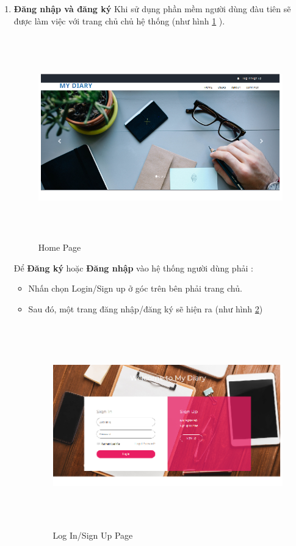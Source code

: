 \documentclass[a4paper]{article}
\begin{document}
	\begin{enumerate}
		\item \textbf{Đăng nhập và đăng ký}
		Khi sử dụng phần mềm người dùng đàu tiên sẽ được làm việc với trang chủ chủ hệ thống (như hình \ref{mainbook16} ).

		\begin{figure}[!h]
	 			\centering
      			\includegraphics[height=250pt,width=340pt]{Images/h8.png}
	 		 	\caption{Home Page}
	 		 	\label{mainbook16}
	  		\end{figure}

		Để \textbf{Đăng ký} hoặc \textbf{Đăng nhập} vào hệ thống người dùng phải :


			\begin{itemize}
				\item Nhấn chọn Login/Sign up ở góc trên bên phải trang chủ.
				\item Sau đó, một trang đăng nhập/đăng ký sẽ hiện ra (như hình \ref{mainbook17})

				\begin{figure}[!h]
	 			\centering
      			\includegraphics[height=250pt,width=340pt]{Images/h11.png}
	 		 	\caption{Log In/Sign Up Page}
	 		 	\label{mainbook17}
	  		\end{figure}


\end{itemize}
\end{enumerate}
\end{document}
